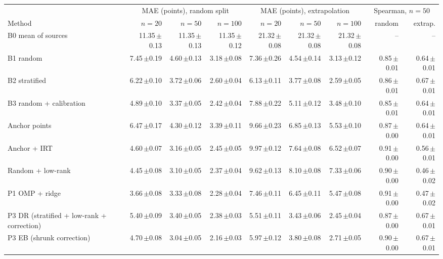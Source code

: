 {\scriptsize\setlength{\tabcolsep}{3pt}
\begin{tabular}{lrrrrrrrr}
\toprule
 & \multicolumn{3}{c}{MAE (points), random split} & \multicolumn{3}{c}{MAE (points), extrapolation} & \multicolumn{2}{c}{Spearman, $n{=}50$} \\
\cmidrule(lr){2-4}\cmidrule(lr){5-7}\cmidrule(lr){8-9}
Method & $n{=}20$ & $n{=}50$ & $n{=}100$ & $n{=}20$ & $n{=}50$ & $n{=}100$ & random & extrap. \\
\midrule
B0 mean of sources & 11.35\,{\tiny$\pm$0.13} & 11.35\,{\tiny$\pm$0.13} & 11.35\,{\tiny$\pm$0.12} & 21.32\,{\tiny$\pm$0.08} & 21.32\,{\tiny$\pm$0.08} & 21.32\,{\tiny$\pm$0.08} & -- & -- \\
B1 random & 7.45\,{\tiny$\pm$0.19} & 4.60\,{\tiny$\pm$0.13} & 3.18\,{\tiny$\pm$0.08} & 7.36\,{\tiny$\pm$0.26} & 4.54\,{\tiny$\pm$0.14} & 3.13\,{\tiny$\pm$0.12} & 0.85\,{\tiny$\pm$0.01} & 0.64\,{\tiny$\pm$0.01} \\
B2 stratified & 6.22\,{\tiny$\pm$0.10} & 3.72\,{\tiny$\pm$0.06} & 2.60\,{\tiny$\pm$0.04} & 6.13\,{\tiny$\pm$0.11} & 3.77\,{\tiny$\pm$0.08} & 2.59\,{\tiny$\pm$0.05} & 0.86\,{\tiny$\pm$0.01} & 0.67\,{\tiny$\pm$0.01} \\
B3 random + calibration & 4.89\,{\tiny$\pm$0.10} & 3.37\,{\tiny$\pm$0.05} & 2.42\,{\tiny$\pm$0.04} & 7.88\,{\tiny$\pm$0.22} & 5.11\,{\tiny$\pm$0.12} & 3.48\,{\tiny$\pm$0.10} & 0.85\,{\tiny$\pm$0.01} & 0.64\,{\tiny$\pm$0.01} \\
Anchor points & 6.47\,{\tiny$\pm$0.17} & 4.30\,{\tiny$\pm$0.12} & 3.39\,{\tiny$\pm$0.11} & 9.66\,{\tiny$\pm$0.23} & 6.85\,{\tiny$\pm$0.13} & 5.53\,{\tiny$\pm$0.10} & 0.87\,{\tiny$\pm$0.00} & 0.64\,{\tiny$\pm$0.01} \\
Anchor + IRT & 4.60\,{\tiny$\pm$0.07} & 3.16\,{\tiny$\pm$0.05} & 2.45\,{\tiny$\pm$0.05} & 9.97\,{\tiny$\pm$0.12} & 7.64\,{\tiny$\pm$0.08} & 6.52\,{\tiny$\pm$0.07} & 0.91\,{\tiny$\pm$0.00} & 0.56\,{\tiny$\pm$0.01} \\
Random + low-rank & 4.45\,{\tiny$\pm$0.08} & 3.10\,{\tiny$\pm$0.05} & 2.37\,{\tiny$\pm$0.04} & 9.62\,{\tiny$\pm$0.13} & 8.10\,{\tiny$\pm$0.08} & 7.33\,{\tiny$\pm$0.06} & 0.90\,{\tiny$\pm$0.00} & 0.46\,{\tiny$\pm$0.02} \\
P1 OMP + ridge & 3.66\,{\tiny$\pm$0.08} & 3.33\,{\tiny$\pm$0.08} & 2.28\,{\tiny$\pm$0.04} & 7.46\,{\tiny$\pm$0.11} & 6.45\,{\tiny$\pm$0.11} & 5.47\,{\tiny$\pm$0.08} & 0.91\,{\tiny$\pm$0.00} & 0.47\,{\tiny$\pm$0.02} \\
P3 DR (stratified + low-rank + correction) & 5.40\,{\tiny$\pm$0.09} & 3.40\,{\tiny$\pm$0.05} & 2.38\,{\tiny$\pm$0.03} & 5.51\,{\tiny$\pm$0.11} & 3.43\,{\tiny$\pm$0.06} & 2.45\,{\tiny$\pm$0.04} & 0.87\,{\tiny$\pm$0.00} & 0.67\,{\tiny$\pm$0.01} \\
P3 EB (shrunk correction) & 4.70\,{\tiny$\pm$0.08} & 3.04\,{\tiny$\pm$0.05} & 2.16\,{\tiny$\pm$0.03} & 5.97\,{\tiny$\pm$0.12} & 3.80\,{\tiny$\pm$0.08} & 2.71\,{\tiny$\pm$0.05} & 0.90\,{\tiny$\pm$0.00} & 0.67\,{\tiny$\pm$0.01} \\
\bottomrule
\end{tabular}}
